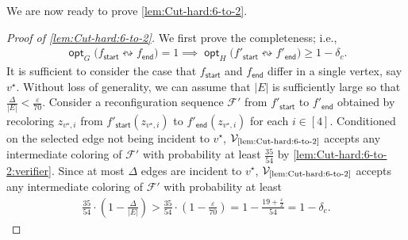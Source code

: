 \documentclass[11pt,fleqn]{article}
\renewcommand{\geq}{\geqslant}
\renewcommand{\epsilon}{\varepsilon}
\newcommand{\reco}{\leftrightsquigarrow}
\DeclareMathOperator{\opt}{\mathsf{opt}}
\newcommand{\sss}{\mathsf{start}}
\newcommand{\ttt}{\mathsf{end}}
\newcommand{\V}{\calV}
\newcommand{\f}{f}
\newcommand{\sqcol}{\scrF}
\newcommand{\Vsix}{\V_{\text{\ref{lem:Cut-hard:6-to-2}}}}
\newcommand{\calV}{\mathcal{V}}
\newcommand{\scrF}{\mathscr{F}}
\theoremstyle{definition}
\numberwithin{equation}{section}
\begin{document}
We are now ready to prove \cref{lem:Cut-hard:6-to-2}.
\begin{proof}[Proof of \cref{lem:Cut-hard:6-to-2}]
We first prove the completeness; i.e., 
\begin{align}
    \opt_G\bigl(\f_\sss \reco \f_\ttt\bigr) = 1
    \implies
    \opt_H\bigl(\f'_\sss \reco \f'_\ttt\bigr) \geq 1-\delta_c.
\end{align}
It is sufficient to consider the case that $\f_\sss$ and $\f_\ttt$ differ in 
a single vertex, say $v^\star$.
Without loss of generality,
we can assume that
$|E|$ is sufficiently large so that $\tfrac{\Delta}{|E|} < \frac{\epsilon}{70}$.
Consider a reconfiguration sequence $\sqcol'$ from $\f'_\sss$ to $\f'_\ttt$
obtained by recoloring $z_{v^\star,i}$
from $\f'_\sss(z_{v^\star,i})$ to $\f'_\ttt(z_{v^\star,i})$
for each $i \in [4]$.
Conditioned on the selected edge not being incident to $v^\star$,
$\Vsix$ accepts any intermediate coloring of $\sqcol'$ with probability at least $\frac{35}{54}$
by \cref{lem:Cut-hard:6-to-2:verifier}.
Since at most $\Delta$ edges are incident to $v^\star$,
$\Vsix$ accepts any intermediate coloring of $\sqcol'$ with probability at least
\begin{align}
    \frac{35}{54} \cdot \left(1 - \frac{\Delta}{|E|}\right)
    > \frac{35}{54} \cdot \left( 1 -\frac{\epsilon}{70} \right)
    = 1-\frac{19+\frac{\epsilon}{2}}{54}
    = 1-\delta_c.
\end{align}


\end{proof}
\end{document}
